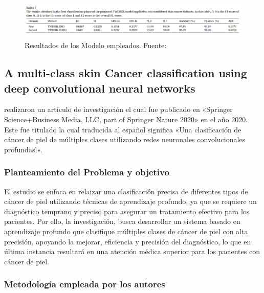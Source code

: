 \begin{figure}[h]
	\begin{center}
		\includegraphics[width=1\textwidth]{2/figuras/Uncertainty_quantification_skin _imagen_01.png}
		\caption{Resultados de los Modelo empleados. Fuente: \cite{abdar2021uncertainty}}
		\label{1:fig 13}
	\end{center}
\end{figure}


\subsection{A multi-class skin Cancer classification using deep convolutional neural networks \citep*{chaturvedi2020multi}}
\citeauthor{chaturvedi2020multi} realizaron un artículo de investigación el cual fue publicado en «Springer Science+Business Media, LLC, part of Springer Nature 2020» en el año 2020. Este fue titulado  la cual traducida al español significa «Una clasificación de cáncer de piel de múltiples clases utilizando redes neuronales convolucionales profundasl».

\subsubsection{Planteamiento del Problema y objetivo}


El estudio se enfoca en relaizar una clasificación precisa de diferentes tipos de cáncer de piel utilizando técnicas de aprendizaje profundo, ya que se requiere un diagnóstico temprano y preciso para asegurar un tratamiento efectivo para los pacientes. 
Por ello, la investigación, busca desarrollar un sistema basado en aprendizaje profundo que clasifique múltiples clases de cáncer de piel con alta precisión, apoyando la mejorar, eficiencia y precisión del diagnóstico, lo que en última instancia resultará en una atención médica superior para los pacientes con cáncer de piel. 
 






\subsubsection{Metodología empleada por los autores}
\newcommand{\TUAMCone}{Recopilación de la data: Se uso los siguetes conjustos de datos: ISIC2017, ISIC2018, y HAM10000. Donde se realizó ajustes para asegurar que los datos estén en un formato adecuado para el entrenamiento de los modelos.
}

